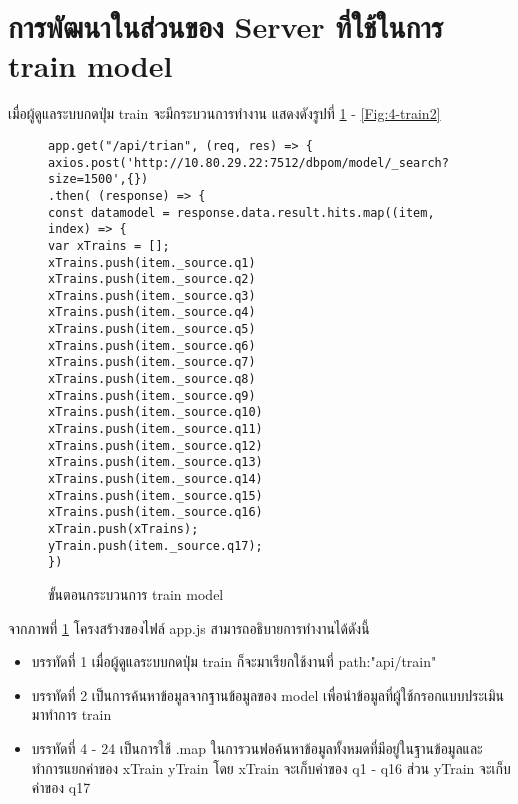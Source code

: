 \section{การพัฒนาในส่วนของ Server ที่ใช้ในการ train model}
เมื่อผู้ดูแลระบบกดปุ่ม train จะมีกระบวนการทำงาน แสดงดังรูปที่ \ref{Fig:4-train} - \ref{Fig:4-train2}
\begin{figure}[H]
{\begin{lstlisting}
app.get("/api/trian", (req, res) => {
axios.post('http://10.80.29.22:7512/dbpom/model/_search?size=1500',{})
.then( (response) => {
const datamodel = response.data.result.hits.map((item, index) => {
var xTrains = [];
xTrains.push(item._source.q1)
xTrains.push(item._source.q2)
xTrains.push(item._source.q3)
xTrains.push(item._source.q4)
xTrains.push(item._source.q5)
xTrains.push(item._source.q6)
xTrains.push(item._source.q7)
xTrains.push(item._source.q8)
xTrains.push(item._source.q9)
xTrains.push(item._source.q10)
xTrains.push(item._source.q11)
xTrains.push(item._source.q12)
xTrains.push(item._source.q13)
xTrains.push(item._source.q14)
xTrains.push(item._source.q15)
xTrains.push(item._source.q16)
xTrain.push(xTrains);
yTrain.push(item._source.q17);
})
\end{lstlisting}}
\caption{ขั้นตอนกระบวนการ train model}
\label{Fig:4-train}
\end{figure}
\newpage
จากภาพที่ \ref{Fig:4-train} โครงสร้างของไฟล์ app.js สามารถอธิบายการทำงานได้ดังนี้
\begin{itemize}[label={--}]
\item บรรทัดที่ 1 เมื่อผู้ดูแลระบบกดปุ่ม train ก็จะมาเรียกใช้งานที่ path:"api/train"
\item บรรทัดที่ 2 เป็นการค้นหาข้อมูลจากฐานข้อมูลของ model เพื่อนำข้อมูลที่ผู้ใช้กรอกแบบประเมินมาทำการ train
\item บรรทัดที่ 4 - 24 เป็นการใช้ .map ในการวนฟอค้นหาข้อมูลทั้งหมดที่มีอยู่ในฐานข้อมูลและทำการแยกค่าของ xTrain yTrain โดย xTrain จะเก็บค่าของ q1 - q16 ส่วน yTrain จะเก็บค่าของ q17
\end{itemize}


